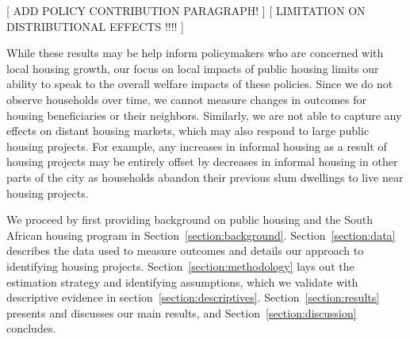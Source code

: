 \documentclass[12pt]{article}
\begin{document}
[ ADD POLICY CONTRIBUTION PARAGRAPH! ]
[  LIMITATION ON DISTRIBUTIONAL EFFECTS !!!!  ]
 

While these results may be help inform policymakers who are concerned with local housing growth, our focus on local impacts of public housing limits our ability to speak to the overall welfare impacts of these policies.  Since we do not observe  households over time, we cannot measure changes in outcomes for housing beneficiaries or their neighbors.  Similarly, we are not able to capture any effects on distant housing markets, which may also respond to large public housing projects.  For example, any increases in informal housing as a result of housing projects may be entirely offset by decreases in informal housing in other parts of the city as households abandon their previous slum dwellings to live near housing projects.


We proceed by first providing background on public housing and the South African housing program in Section~\ref{section:background}. 
Section~\ref{section:data} describes the data used to measure outcomes and details our approach to identifying housing projects. Section~\ref{section:methodology} lays out the estimation strategy and identifying assumptions, which we validate with descriptive evidence in section~\ref{section:descriptives}. Section~\ref{section:results} presents and discusses our main results, and  Section~\ref{section:discussion} concludes.




\end{document}
